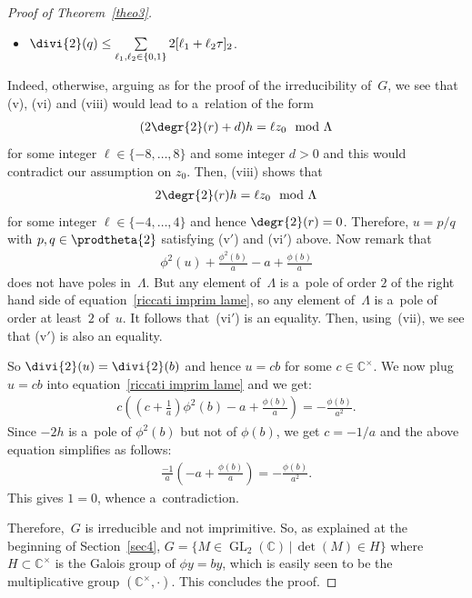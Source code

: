 \documentclass[pdftex]{sigma}
\numberwithin{equation}{section}
\begin{document}
\begin{proof}[Proof of Theorem~\ref{theo3}]
\begin{itemize}
\item[(vi$'$)] $\divi{2} (q) \leq \sum\limits_{\ell_{1},\ell_{2} \in \{0,1\}}2[\ell_{1}+\ell_{2}\tau]_{2}$.
\end{itemize}
Indeed, otherwise, arguing as for the proof of the irreducibility of~$G$, we see that (v), (vi) and (viii) would lead to
a~relation of the form
\begin{gather*}
(2\degr{2} (r) + d)h = \ell z_{0} \mod \Lambda
\end{gather*}
for some integer $\ell \in \{-8,\dots,8\}$ and some integer $d>0$ and this would contradict our assumption on $z_{0}$.
Then, (viii) shows that
\begin{gather*}
2\degr{2} (r) h = \ell z_{0} \mod \Lambda
\end{gather*}
for some integer $\ell \in \{-4,\dots,4\}$ and hence $\degr{2} (r)=0$.
Therefore, $u=p/q$ with $p,q \in \prodtheta{2}$ satisfying (v$'$) and (vi$'$) above.
Now remark that
\begin{gather*}
\phi^{2}(u)+\frac{\phi^{2}(b)}{a}-a+\frac{\phi(b)}{a}
\end{gather*}
does not have poles in~$\Lambda$.
But any element of~$\Lambda$ is a~pole of order $2$ of the right hand side of equation~\eqref{riccati imprim lame}, so
any element of~$\Lambda$ is a~pole of order at least~$2$ of~$u$.
It follows that~(vi$'$) is an equality.
Then, using~(vii), we see that (v$'$) is also an equality.

So $\divi{2}(u)=\divi{2}(b)$ and hence $u=cb$ for some $c \in \mathbb C^{\times}$.
We now plug $u=cb$ into equation~\eqref{riccati imprim lame} and we get:
\begin{gather*}
c\left(\left(c+\frac{1}{a}\right)\phi^{2}(b)-a+\frac{\phi(b)}{a} \right)=-\frac{\phi(b)}{a^{2}}.
\end{gather*}
Since $-2h$ is a~pole of $\phi^{2}(b)$ but not of $\phi(b)$, we get $c=-1/a$ and the above equation simplif\/ies as
follows:
\begin{gather*}
\frac{-1}{a}\left(-a+\frac{\phi(b)}{a} \right)=-\frac{\phi(b)}{a^{2}}.
\end{gather*}
This gives $1=0$, whence a~contradiction.

Therefore,~$G$ is irreducible and not imprimitive.
So, as explained at the beginning of Section~\ref{sec4}, $G = \{M \in \operatorname{GL}_{2}(\mathbb C) \, \vert \, \det
(M) \in H\}$ where~$H \subset \mathbb C^{\times}$ is the Galois group of $\phi y = b y$, which is easily seen to be the
multiplicative group $(\mathbb C^{\times},\cdot)$.
This concludes the proof.
\end{proof}
\end{document}
